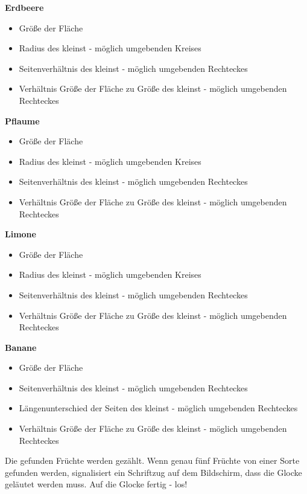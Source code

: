 \textbf{Erdbeere}

\begin{itemize}
    \item Größe der Fläche
    \item Radius des kleinst - möglich umgebenden Kreises
    \item Seitenverhältnis des kleinst - möglich umgebenden Rechteckes
    \item Verhältnis Größe der Fläche zu Größe des kleinst - möglich umgebenden Rechteckes
\end{itemize}

\textbf{Pflaume}

\begin{itemize}
    \item Größe der Fläche
    \item Radius des kleinst - möglich umgebenden Kreises
    \item Seitenverhältnis des kleinst - möglich umgebenden Rechteckes
     \item Verhältnis Größe der Fläche zu Größe des kleinst - möglich umgebenden Rechteckes
\end{itemize}

\textbf{Limone}

\begin{itemize}
    \item Größe der Fläche
    \item Radius des kleinst - möglich umgebenden Kreises
    \item Seitenverhältnis des kleinst - möglich umgebenden Rechteckes
     \item Verhältnis Größe der Fläche zu Größe des kleinst - möglich umgebenden Rechteckes
\end{itemize}

\textbf{Banane}

\begin{itemize}
    \item Größe der Fläche
    \item Seitenverhältnis des kleinst - möglich umgebenden Rechteckes
    \item Längenunterschied der Seiten des kleinst - möglich umgebenden Rechteckes
    \item Verhältnis Größe der Fläche zu Größe des kleinst - möglich umgebenden Rechteckes
\end{itemize}

Die gefunden Früchte werden gezählt. Wenn genau fünf Früchte von einer Sorte gefunden werden, signalisiert ein Schriftzug auf dem Bildschirm, dass die Glocke geläutet werden muss. Auf die Glocke fertig - los!








 


